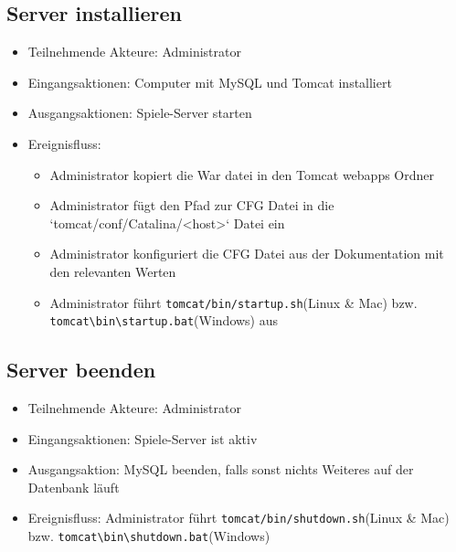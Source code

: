 \documentclass[a4paper]{scrreprt}
\begin{document}
    \subsection{Server installieren}
    \begin{itemize}
        \item Teilnehmende Akteure: \Gls{Administrator} 
        \item Eingangsaktionen: Computer mit MySQL und Tomcat installiert
        \item Ausgangsaktionen: Spiele-Server starten
        \item Ereignisfluss: 
            \begin{itemize}
                \item Administrator kopiert die War datei in den Tomcat webapps Ordner
                \item Administrator fügt den Pfad zur CFG Datei in die `tomcat/conf/Catalina/<host>` Datei ein
                \item Administrator konfiguriert die CFG Datei aus der Dokumentation mit den relevanten Werten
                \item Administrator führt \texttt{tomcat/bin/startup.sh}(Linux \& Mac) bzw. \texttt{tomcat\textbackslash bin\textbackslash startup.bat}(Windows) aus
            \end{itemize}
    \end{itemize}

    \subsection{Server beenden}
    \begin{itemize}
        \item Teilnehmende Akteure: Administrator
        \item Eingangsaktionen: Spiele-Server ist aktiv
        \item Ausgangsaktion: MySQL beenden, falls sonst nichts Weiteres auf der Datenbank läuft
        \item Ereignisfluss: Administrator führt \texttt{tomcat/bin/shutdown.sh}(Linux \& Mac) bzw. \texttt{tomcat\textbackslash bin\textbackslash shutdown.bat}(Windows)
    \end{itemize}
\end{document}
